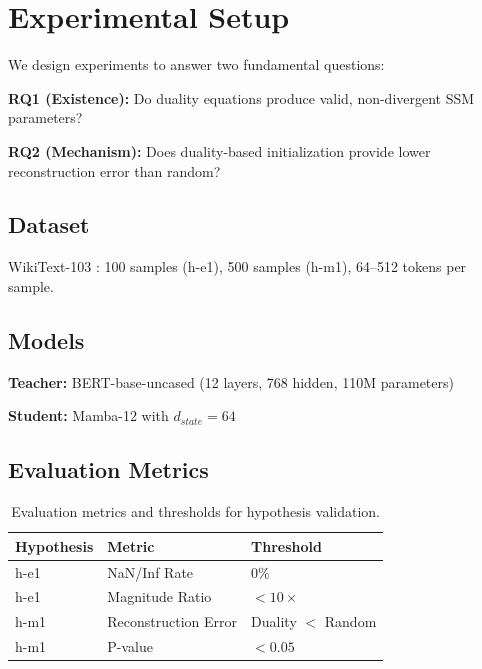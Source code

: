 \section{Experimental Setup}
\label{sec:experiments}

We design experiments to answer two fundamental questions:

\textbf{RQ1 (Existence):} Do duality equations produce valid, non-divergent SSM parameters?

\textbf{RQ2 (Mechanism):} Does duality-based initialization provide lower reconstruction error than random?

\subsection{Dataset}

WikiText-103 \citep{merity2017wikitext}: 100 samples (h-e1), 500 samples (h-m1), 64--512 tokens per sample.

\subsection{Models}

\textbf{Teacher:} BERT-base-uncased (12 layers, 768 hidden, 110M parameters)

\textbf{Student:} Mamba-12 with $d_{state} = 64$

\subsection{Evaluation Metrics}

\begin{table}[h]
\centering
\caption{Evaluation metrics and thresholds for hypothesis validation.}
\label{tab:metrics}
\begin{tabular}{lll}
\toprule
\textbf{Hypothesis} & \textbf{Metric} & \textbf{Threshold} \\
\midrule
h-e1 & NaN/Inf Rate & 0\% \\
h-e1 & Magnitude Ratio & $< 10\times$ \\
h-m1 & Reconstruction Error & Duality $<$ Random \\
h-m1 & P-value & $< 0.05$ \\
\bottomrule
\end{tabular}
\end{table}
